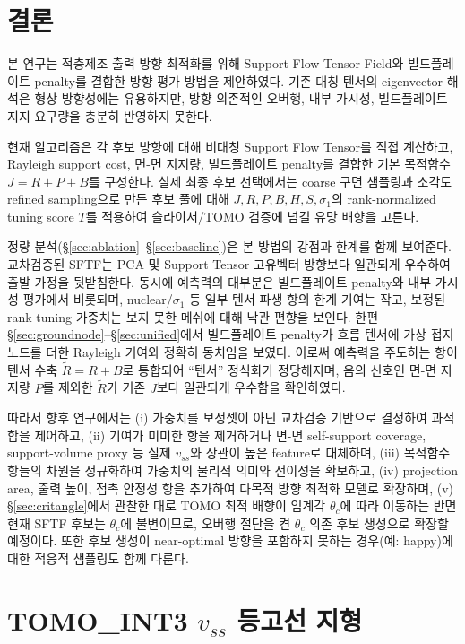 \documentclass[11pt,a4paper]{article}
\begin{document}
\section{결론}

본 연구는 적층제조 출력 방향 최적화를 위해 Support Flow Tensor Field와 빌드플레이트 penalty를 결합한 방향 평가 방법을 제안하였다.
기존 대칭 텐서의 eigenvector 해석은 형상 방향성에는 유용하지만,
방향 의존적인 오버행, 내부 가시성, 빌드플레이트 지지 요구량을 충분히 반영하지 못한다.

현재 알고리즘은 각 후보 방향에 대해 비대칭 Support Flow Tensor를 직접 계산하고,
Rayleigh support cost, 면-면 지지량, 빌드플레이트 penalty를 결합한 기본 목적함수 $J=R+P+B$를 구성한다.
실제 최종 후보 선택에서는 coarse 구면 샘플링과 소각도 refined sampling으로 만든 후보 풀에 대해
$J,R,P,B,H,S,\sigma_1$의 rank-normalized tuning score $T$를 적용하여
슬라이서/TOMO 검증에 넘길 유망 배향을 고른다.

정량 분석(\S\ref{sec:ablation}--\S\ref{sec:baseline})은 본 방법의 강점과 한계를 함께 보여준다.
교차검증된 SFTF는 PCA 및 Support Tensor 고유벡터 방향보다 일관되게 우수하여 출발 가정을 뒷받침한다.
동시에 예측력의 대부분은 빌드플레이트 penalty와 내부 가시성 평가에서 비롯되며,
nuclear/$\sigma_1$ 등 일부 텐서 파생 항의 한계 기여는 작고,
보정된 rank tuning 가중치는 보지 못한 메쉬에 대해 낙관 편향을 보인다.
한편 \S\ref{sec:groundnode}--\S\ref{sec:unified}에서 빌드플레이트 penalty가
흐름 텐서에 가상 접지 노드를 더한 Rayleigh 기여와 정확히 동치임을 보였다.
이로써 예측력을 주도하는 항이 텐서 수축 $\tilde R=R+B$로 통합되어 ``텐서'' 정식화가 정당해지며,
음의 신호인 면-면 지지량 $P$를 제외한 $\tilde R$가 기존 $J$보다 일관되게 우수함을 확인하였다.

따라서 향후 연구에서는 (i) 가중치를 보정셋이 아닌 교차검증 기반으로 결정하여 과적합을 제어하고,
(ii) 기여가 미미한 항을 제거하거나 면-면 self-support coverage, support-volume proxy 등
실제 $v_{ss}$와 상관이 높은 feature로 대체하며,
(iii) 목적함수 항들의 차원을 정규화하여 가중치의 물리적 의미와 전이성을 확보하고,
(iv) projection area, 출력 높이, 접촉 안정성 항을 추가하여 다목적 방향 최적화 모델로 확장하며,
(v) \S\ref{sec:critangle}에서 관찰한 대로 TOMO 최적 배향이 임계각 $\theta_c$에 따라 이동하는 반면
현재 SFTF 후보는 $\theta_c$에 불변이므로, 오버행 절단을 켠 $\theta_c$ 의존 후보 생성으로 확장할 예정이다.
또한 후보 생성이 near-optimal 방향을 포함하지 못하는 경우(예: happy)에 대한 적응적 샘플링도 함께 다룬다.

\appendix

\section{TOMO\_INT3 $v_{ss}$ 등고선 지형}
\label{sec:appendix-landscape}
\end{document}
